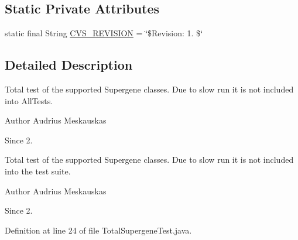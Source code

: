 \subsection*{Static Private Attributes}
\begin{DoxyCompactItemize}
\item 
static final String \hyperlink{classexamples_1_1supergene_1_1_total_supergene_test_a567a9d68b902b0d7a016c18b2e09207d}{C\-V\-S\-\_\-\-R\-E\-V\-I\-S\-I\-O\-N} = \char`\"{}\$Revision\-: 1. \$\char`\"{}
\end{DoxyCompactItemize}


\subsection{Detailed Description}
Total test of the supported Supergene classes. Due to slow run it is not included into All\-Tests.

\begin{DoxyAuthor}{Author}
Audrius Meskauskas 
\end{DoxyAuthor}
\begin{DoxySince}{Since}
2.
\end{DoxySince}
Total test of the supported Supergene classes. Due to slow run it is not included into the test suite.

\begin{DoxyAuthor}{Author}
Audrius Meskauskas 
\end{DoxyAuthor}
\begin{DoxySince}{Since}
2. 
\end{DoxySince}


Definition at line 24 of file Total\-Supergene\-Test.\-java.



